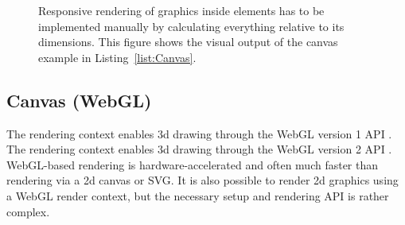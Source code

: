\begin{figure}[tp]
\centering
{}
\hspace{1cm}
\caption[Canvas With Responsive Circles]{
Responsive rendering of graphics inside  elements has to be
implemented manually by calculating everything relative to its dimensions. 
This figure shows the visual output
of the canvas example in Listing~\ref{list:Canvas}. 
}
\label{fig:Canvas}
\end{figure}







\subsection{Canvas (WebGL)}
\label{sec:CanvasWebGL}

The  rendering context enables 3d drawing through the
WebGL version 1 API \parencite{WebGL1}. The 
rendering context enables 3d drawing through the WebGL version 2 API
\parencite{WebGL2}. WebGL-based rendering is hardware-accelerated and
often much faster than rendering via a 2d canvas or SVG. It is also
possible to render 2d graphics using a WebGL render context, but the
necessary setup and rendering API is rather complex.   



